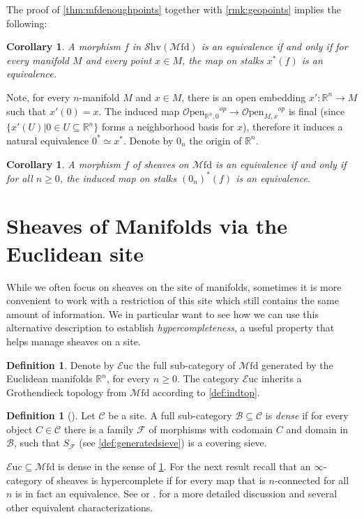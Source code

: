 \documentclass[10pt]{amsart}
\newcommand{\B}{\mathscr{B}}
\newcommand{\C}{\mathscr{C}}
\newcommand{\F}{\mathscr{F}}
\newcommand{\bR}{\mathbb{R}}
\newcommand{\Euc}{\mathscr{E}\mathrm{uc}}
\newcommand{\Mfd}{\mathscr{M}\mathrm{fd}}
\newcommand{\Shv}{\mathscr{S}\mathrm{hv}}
\newcommand{\Open}{\mathscr{O}\mathrm{pen}}
\newtheorem{corollary}[equation]{Corollary}
\theoremstyle{definition}
\newtheorem{definition}[equation]{Definition}
\theoremstyle{remark}
\numberwithin{equation}{section}
\begin{document}
The proof of \cref{thm:mfdenoughpoints} together with \cref{rmk:geopoints} implies the following: 
\begin{corollary}
  A morphism $f$ in $\Shv(\Mfd)$ is an equivalence if and only if for every manifold $M$ and every point $x \in M$, the map on stalks $x^*(f)$ is an equivalence.
\end{corollary}
Note, for every $n$-manifold $M$ and $x\in M$, there is an open embedding $x':\bR^n\to M$ such that $x'(0)=x$. The induced map $\Open_{\bR^n,0}{}^{op}\to\Open_{M,x}{}^{op}$ is final (since $\{x'(U)|0\in U\subseteq\bR^n\}$ forms a neighborhood basis for $x$), therefore it induces a natural equivalence $0^*\simeq x^*$. Denote by $0_n$ the origin of $\bR^n$. 
\begin{corollary}
  A morphism $f$ of sheaves on $\Mfd$ is an equivalence if and only if for all $n \geq 0$, the induced map on stalks $(0_n)^*(f) $ is an equivalence.
\end{corollary}

\section{Sheaves of Manifolds via the Euclidean site}
While we often focus on sheaves on the site of manifolds, sometimes it is more convenient to work with a restriction of this site which still contains the same amount of information. We in particular want to see how we can use this alternative description to establish \emph{hypercompleteness}, a useful property that helps manage sheaves on a site.

\begin{definition}
	Denote by $\Euc$ the full sub-category of $\Mfd$ generated by the Euclidean manifolds $\bR^n$, for every $n\geq0$. The category $\Euc$ inherits a Grothendieck topology from $\Mfd$ according to \cref{def:indtop}.
\end{definition}
\begin{definition}[{\cite[Definition 3.12.2]{barwick2020exodromy}}]\label{def:dense}
	Let $\C$ be a site. A full sub-category $\B\subseteq\C$ is \emph{dense} if for every object $C\in\C$ there is a family $\F$ of morphisms with codomain $C$ and domain in $\B$, such that $S_\F$ (see \cref{def:generatedsieve}) is a covering sieve. 
\end{definition}

$\Euc\subseteq\Mfd$ is dense in the sense of \cref{def:dense}. For the next result recall that an $\infty$-category of sheaves is hypercomplete if for every map that is $n$-connected for all $n$ is in fact an equivalence. See \cite[\S\S 6.5.2]{lurie2009htt} or \cite{dugger2003hypercoverssimplicialpresheaves}. for a more detailed discussion and several other equivalent characterizations. 
\end{document}
